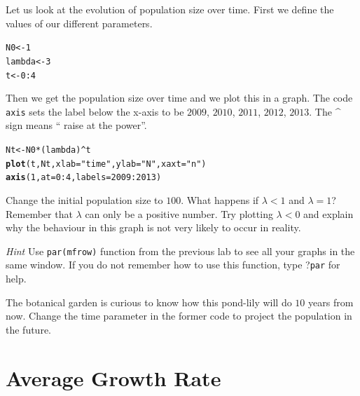 \documentclass{article}\usepackage[]{graphicx}\usepackage[]{color}
\makeatletter
\newcommand{\hlnum}[1]{\textcolor[rgb]{0.686,0.059,0.569}{#1}}%
\newcommand{\hlstr}[1]{\textcolor[rgb]{0.192,0.494,0.8}{#1}}%
\newcommand{\hlopt}[1]{\textcolor[rgb]{0,0,0}{#1}}%
\newcommand{\hlstd}[1]{\textcolor[rgb]{0.345,0.345,0.345}{#1}}%
\newcommand{\hlkwb}[1]{\textcolor[rgb]{0.69,0.353,0.396}{#1}}%
\newcommand{\hlkwc}[1]{\textcolor[rgb]{0.333,0.667,0.333}{#1}}%
\newcommand{\hlkwd}[1]{\textcolor[rgb]{0.737,0.353,0.396}{\textbf{#1}}}%
\newenvironment{kframe}{%
 \def\at@end@of@kframe{}%
 \ifinner\ifhmode%
  \def\at@end@of@kframe{\end{minipage}}%
  \begin{minipage}{\columnwidth}%
 \fi\fi%
 \def\FrameCommand##1{\hskip\@totalleftmargin \hskip-\fboxsep
 \colorbox{shadecolor}{##1}\hskip-\fboxsep
     \hskip-\linewidth \hskip-\@totalleftmargin \hskip\columnwidth}%
 \MakeFramed {\advance\hsize-\width
   \@totalleftmargin\z@ \linewidth\hsize
   \@setminipage}}%
 {\par\unskip\endMakeFramed%
 \at@end@of@kframe}
\newenvironment{knitrout}{}{} %
\makeatother
\begin{document}
Let us look at the evolution of population size over time. First we define the values of our different parameters.
\begin{knitrout}
\color{fgcolor}\begin{kframe}
\begin{alltt}
\hlstd{N0}\hlkwb{<-} \hlnum{1}
\hlstd{lambda} \hlkwb{<-} \hlnum{3}
\hlstd{t}\hlkwb{<-}\hlnum{0}\hlopt{:}\hlnum{4}
\end{alltt}
\end{kframe}
\end{knitrout}
Then we get the population size over time and we plot this in a graph. The code \texttt{axis} sets the label below the x-axis to be $2009$, $2010$, $2011$, $2012$, $2013$. The \textasciicircum  \; sign means \textquotedblleft
raise at the power\textquotedblright.
\begin{knitrout}
\color{fgcolor}\begin{kframe}
\begin{alltt}
\hlstd{Nt}\hlkwb{<-}\hlstd{N0}\hlopt{*}\hlstd{(lambda)}\hlopt{^}\hlstd{t}
\hlkwd{plot}\hlstd{(t, Nt,}\hlkwc{xlab}\hlstd{=}\hlstr{"time"}\hlstd{,} \hlkwc{ylab}\hlstd{=}\hlstr{"N"}\hlstd{,} \hlkwc{xaxt} \hlstd{=} \hlstr{"n"}\hlstd{)}
\hlkwd{axis}\hlstd{(}\hlnum{1}\hlstd{,} \hlkwc{at}\hlstd{=}\hlnum{0}\hlopt{:}\hlnum{4}\hlstd{,} \hlkwc{labels}\hlstd{=}\hlnum{2009}\hlopt{:}\hlnum{2013}\hlstd{)}
\end{alltt}
\end{kframe}
\end{knitrout}
Change the initial population size to $100$. What happens if $\lambda<1$ and $\lambda=1$? Remember that $\lambda$ can only be a positive number. Try plotting $\lambda<0$ and explain why the behaviour in this graph is not very likely to occur in reality. 


 \textit{Hint} Use \texttt{par(mfrow)} function from the previous lab to see all your graphs in the same window. If you do not remember how to use this function, type ?\texttt{par} for help. 



The botanical garden is curious to know how this pond-lily will do $10$ years from now. Change the time parameter in the former code to project the population in the future. 

\section{Average Growth Rate}
\end{document}

